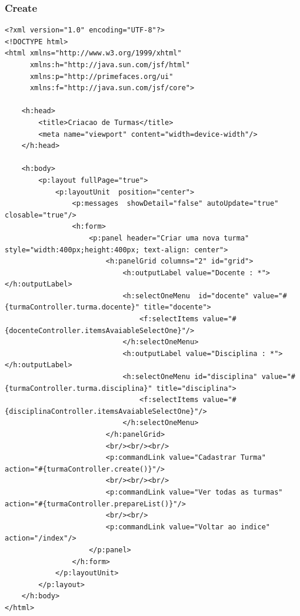\documentclass[12pt,a4paper]{article}
\begin{document}
\subsubsection{Create}
\label{subsubsectionTurmaCreate}
\begin{lstlisting}
<?xml version="1.0" encoding="UTF-8"?>
<!DOCTYPE html>
<html xmlns="http://www.w3.org/1999/xhtml"
      xmlns:h="http://java.sun.com/jsf/html"
      xmlns:p="http://primefaces.org/ui"
      xmlns:f="http://java.sun.com/jsf/core">

    <h:head>
        <title>Criacao de Turmas</title>
        <meta name="viewport" content="width=device-width"/>
    </h:head>

    <h:body>
        <p:layout fullPage="true"> 
            <p:layoutUnit  position="center">
                <p:messages  showDetail="false" autoUpdate="true" closable="true"/>
                <h:form>
                    <p:panel header="Criar uma nova turma" style="width:400px;height:400px; text-align: center">  
                        <h:panelGrid columns="2" id="grid">  
                            <h:outputLabel value="Docente : *"></h:outputLabel>  
                            <h:selectOneMenu  id="docente" value="#{turmaController.turma.docente}" title="docente">
                                <f:selectItems value="#{docenteController.itemsAvaiableSelectOne}"/>
                            </h:selectOneMenu>
                            <h:outputLabel value="Disciplina : *"></h:outputLabel>  
                            <h:selectOneMenu id="disciplina" value="#{turmaController.turma.disciplina}" title="disciplina">
                                <f:selectItems value="#{disciplinaController.itemsAvaiableSelectOne}"/>
                            </h:selectOneMenu>
                        </h:panelGrid>  
                        <br/><br/><br/>
                        <p:commandLink value="Cadastrar Turma" action="#{turmaController.create()}"/>
                        <br/><br/><br/>
                        <p:commandLink value="Ver todas as turmas" action="#{turmaController.prepareList()}"/>
                        <br/><br/>
                        <p:commandLink value="Voltar ao indice" action="/index"/>
                    </p:panel>
                </h:form>
            </p:layoutUnit>
        </p:layout>
    </h:body>
</html>
\end{lstlisting}
\end{document}
